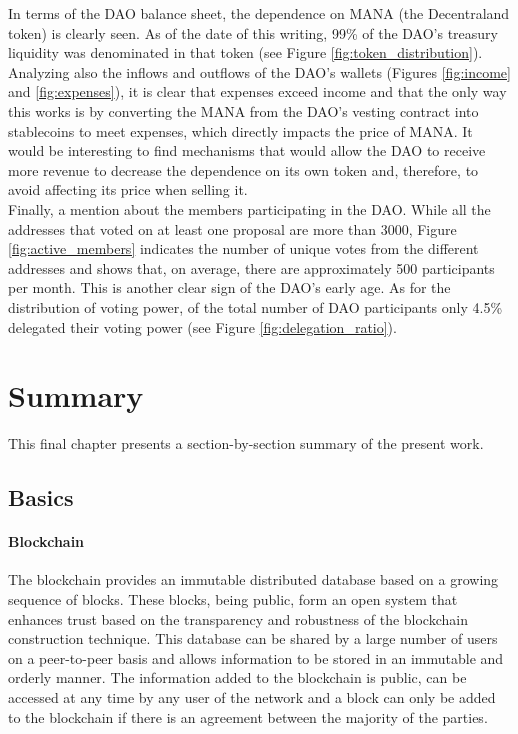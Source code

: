 \documentclass[MSE,Master,english]{twbook}%
\begin{document}
In terms of the DAO balance sheet, the dependence on MANA (the Decentraland token) is clearly seen. As of the date of this writing, 99\% of the DAO's treasury liquidity was denominated in that token (see Figure \ref{fig:token_distribution}). Analyzing also the inflows and outflows of the DAO's wallets (Figures \ref{fig:income} and \ref{fig:expenses}), it is clear that expenses exceed income and that the only way this works is by converting the MANA from the DAO's vesting contract into stablecoins to meet expenses, which directly impacts the price of MANA. It would be interesting to find mechanisms that would allow the DAO to receive more revenue to decrease the dependence on its own token and, therefore, to avoid affecting its price when selling it. \\

Finally, a mention about the members participating in the DAO. While all the addresses that voted on at least one proposal are more than 3000, Figure \ref{fig:active_members} indicates the number of unique votes from the different addresses and shows that, on average, there are approximately 500 participants per month. This is another clear sign of the DAO's early age. As for the distribution of voting power, of the total number of DAO participants only 4.5\% delegated their voting power (see Figure \ref{fig:delegation_ratio}).

\chapter{Summary\label{summary}}
This final chapter presents a section-by-section summary of the present work.

\section{Basics}
\subsubsection{Blockchain}
The blockchain provides an immutable distributed database based on a growing sequence of blocks. These blocks, being public, form an open system that enhances trust based on the transparency and robustness of the blockchain construction technique. This database can be shared by a large number of users on a peer-to-peer basis and allows information to be stored in an immutable and orderly manner. The information added to the blockchain is public, can be accessed at any time by any user of the network and a block can only be added to the blockchain if there is an agreement between the majority of the parties.
\end{document}
